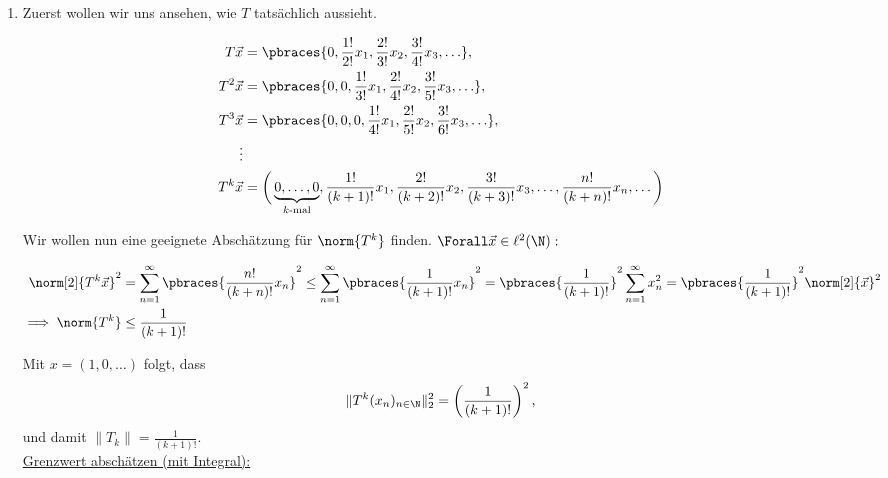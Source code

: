 \begin{solution}

\phantom{}

\begin{enumerate}[label = (\alph*)]

  \item
  Zuerst wollen wir uns ansehen, wie $T$ tatsächlich aussieht.

  \begin{align*}
    T \vec x
    & =
    \pbraces
    {
      0,
      \frac{1!}{2!} x_1,
      \frac{2!}{3!} x_2,
      \frac{3!}{4!} x_3,
      \ldots
    }, \\
    T^2 \vec x
    & =
    \pbraces
    {
      0, 0,
      \frac{1!}{3!} x_1,
      \frac{2!}{4!} x_2,
      \frac{3!}{5!} x_3,
      \ldots
    }, \\
    T^3 \vec x
    & =
    \pbraces
    {
      0, 0, 0,
      \frac{1!}{4!} x_1,
      \frac{2!}{5!} x_2,
      \frac{3!}{6!} x_3,
      \ldots
    }, \\
    \vdots \\
    T^k \vec x
    & =
    \bigg (
      \underbrace{0, \ldots, 0}_{k \text{-mal}},
      \frac{1!}{(k+1)!} x_1,
      \frac{2!}{(k+2)!} x_2,
      \frac{3!}{(k+3)!} x_3,
      \ldots,
      \frac{n!}{(k+n)!} x_n,
      \ldots
    \bigg )
  \end{align*}

  Wir wollen nun eine geeignete Abschätzung für $\norm{T^k}$ finden.
  $\Forall \vec x \in \ell^2(\N):$

  \begin{align*}
    \norm[2]{T^k \vec x}^2
    & =
    \sum_{n=1}^\infty
    \pbraces
    {
      \frac{n!}{(k+n)!}
      x_n
    }^2
    \leq
    \sum_{n=1}^\infty
    \pbraces
    {
      \frac{1}{(k+1)!}
      x_n
    }^2
    =
    \pbraces{\frac{1}{(k+1)!}}^2
    \sum_{n=1}^\infty x_n^2
    =
    \pbraces{\frac{1}{(k+1)!}}^2
    \norm[2]{\vec x}^2 \\
    \implies
    \norm{T^k}
    & \leq
    \frac{1}{(k+1)!}
  \end{align*}

  Mit $x = (1,0,\dots)$ folgt, dass
  \begin{align*}
    \|T^k(x_n)_{n \in \N}\|_2^2 = \left(\frac{1}{(k+1)!}\right)^2,
  \end{align*}
  und damit $\|T_k\| = \frac{1}{(k+1)!}$. \\

  \underline{Grenzwert abschätzen (mit Integral):} \\


\end{enumerate}
\end{solution}
